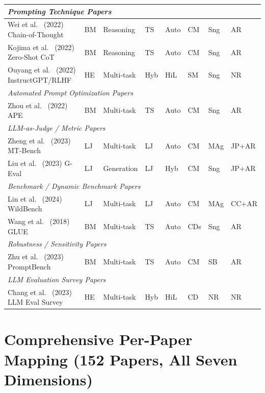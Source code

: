 \documentclass[acmsmall, nonacm, screen]{acmart}
\begin{document}
\begin{landscape}
{\begin{longtable}{p{3.2cm} p{1.8cm} p{1.1cm} p{1.5cm} p{1.1cm} p{1.2cm} p{1.1cm} p{2.4cm}}
\multicolumn{8}{l}{\textit{Prompting Technique Papers}} \\ \midrule
\rowcolor{rowgray}
Wei et al.~\cite{wei2022chain} (2022) Chain-of-Thought &
BM & Reasoning & TS & Auto & CM & Sng & AR \\
Kojima et al.~\cite{kojima2022large} (2022) Zero-Shot CoT &
BM & Reasoning & TS & Auto & CM & Sng & AR \\
\rowcolor{rowgray}
Ouyang et al.~\cite{ouyang2022training} (2022) InstructGPT/RLHF &
HE & Multi-task & Hyb & HiL & SM & Sng & NR \\
\midrule
\multicolumn{8}{l}{\textit{Automated Prompt Optimization Papers}} \\ \midrule
Zhou et al.~\cite{zhou2022ape} (2022) APE &
BM & Multi-task & TS & Auto & CM & Sng & AR \\
\midrule
\multicolumn{8}{l}{\textit{LLM-as-Judge / Metric Papers}} \\ \midrule
\rowcolor{rowgray}
Zheng et al.~\cite{zheng2023judging} (2023) MT-Bench &
LJ & Multi-task & LJ & Auto & CM & MAg & JP+AR \\
Liu et al.~\cite{liu2023geval} (2023) G-Eval &
LJ & Generation & LJ & Hyb & CM & Sng & JP+AR \\
\midrule
\multicolumn{8}{l}{\textit{Benchmark / Dynamic Benchmark Papers}} \\ \midrule
\rowcolor{rowgray}
Lin et al.~\cite{wildbench2024} (2024) WildBench &
LJ & Multi-task & LJ & Auto & CM & MAg & CC+AR \\
Wang et al.~\cite{wang2018glue} (2018) GLUE &
BM & Multi-task & TS & Auto & CDs & Sng & AR \\
\midrule
\multicolumn{8}{l}{\textit{Robustness / Sensitivity Papers}} \\ \midrule
\rowcolor{rowgray}
Zhu et al.~\cite{promptbench2023} (2023) PromptBench &
BM & Multi-task & TS & Auto & CM & SB & AR \\
\midrule
\multicolumn{8}{l}{\textit{LLM Evaluation Survey Papers}} \\ \midrule
Chang et al.~\cite{chang2023survey} (2023) LLM Eval Survey &
HE & Multi-task & Hyb & HiL & CD & NR & NR \\

\end{longtable}
}
\end{landscape}

\setcounter{table}{0}
\section{Comprehensive Per-Paper Mapping (152 Papers, All Seven Dimensions)}
\label{app:fullmapping}
\end{document}
